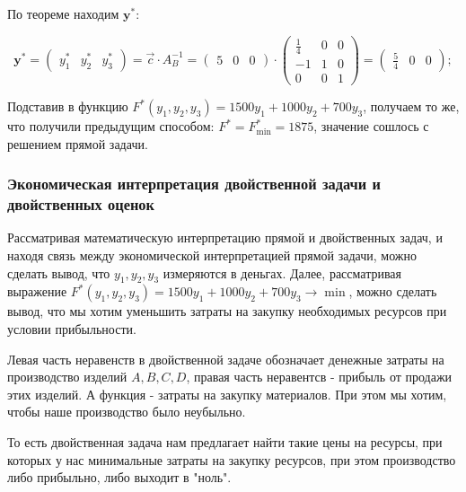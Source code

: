 По теореме находим $ \mathbf{y^*}  $:

\[ \mathbf{y^*}= \begin{pmatrix}
        y_1^* & y_2^* & y_3^*
    \end{pmatrix}= \overrightarrow{c} \cdot A_B^{ -1} = \begin{pmatrix}
        5 & 0 & 0
    \end{pmatrix} \cdot
    \begin{pmatrix}
        \frac{ 1}{ 4} & 0 & 0 \\
        -1            & 1 & 0 \\
        0             & 0 & 1
    \end{pmatrix} = \begin{pmatrix}
        \frac{ 5}{ 4} & 0 & 0
    \end{pmatrix}
    ;\]

Подставив в функцию $ F^{ *}(y_{ 1}, y_{ 2}, y_{ 3}) = 1500y_{ 1} + 1000y_{ 2} + 700y_{ 3} $, получаем то же, что получили предыдущим способом: $ F^{ *} = F_{ \min}^{ *} = 1875 $,
значение сошлось с решением прямой задачи.

\subsubsection{Экономическая интерпретация двойственной задачи и двойственных оценок}

Рассматривая математическую интерпретацию прямой и двойственных задач, и находя связь между экономической интерпретацией прямой задачи,
можно сделать вывод, что $ y_1, y_2, y_3 $ измеряются в деньгах. Далее, рассматривая выражение
$ F^{ *}(y_{ 1}, y_{ 2}, y_{ 3}) = 1500y_{ 1} + 1000y_{ 2} + 700y_{ 3} \to \min$, можно сделать вывод, что
мы хотим уменьшить затраты на закупку необходимых ресурсов при условии прибыльности.

Левая часть неравенств в двойственной задаче обозначает денежные затраты на производство изделий $ A, B, C, D $,
правая часть неравентсв - прибыль от продажи этих изделий. А функция - затраты на закупку материалов.
При этом мы хотим, чтобы наше производство было неубыльно.

То есть двойственная задача нам предлагает найти такие цены на ресурсы, при которых у нас минимальные затраты на закупку ресурсов, при
этом производство либо прибыльно, либо выходит в "ноль".